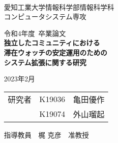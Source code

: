 \begin{titlepage}

  \ \\
  \begin{center}

    {\LARGE 愛知工業大学情報科学部情報科学科\\
      コンピュータシステム専攻

      \vspace{1.0cm}

      令和4年度~卒業論文\\

      \vspace{2.0cm}
      {\Huge
        \baselineskip=15mm
        \textbf{独立したコミュニティにおける\\滞在ウォッチの安定運用のための\\システム拡張に関する研究\\}}

      \vspace{7.0cm}

      2023年2月\\

      \vspace{1.0cm}

      \begin{tabular}[h]{lll}
        研究者 & K19036 & 亀田優作 \\
            & K19074 & 外山瑠起 \\
      \end{tabular}

      \vspace{1.0cm}

      指導教員\ \
      梶 克彦\ \
      准教授
    }

  \end{center}

\end{titlepage}
